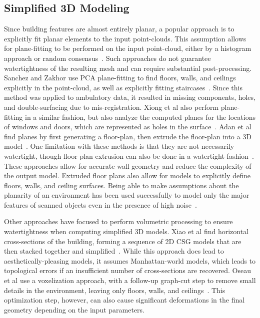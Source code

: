\documentclass[12pt,onecolumn,oneside]{book}
\begin{document}
\subsection{Simplified 3D Modeling}
\label{ssec:background_planefit}

Since building features are almost entirely planar, a popular approach is to explicitly fit planar elements to the input point-clouds.  This assumption allows for plane-fitting to be performed on the input point-cloud, either by a histogram approach or random consensus~\cite{HistWallRecon,BasicPlaneFit}.  Such approaches do not guarantee watertightness of the resulting mesh and can require substantial post-processing.  Sanchez and Zakhor use PCA plane-fitting to find floors, walls, and ceilings explicitly in the point-cloud, as well as explicitly fitting staircases~\cite{Victors}. Since this method was applied to ambulatory data, it resulted in missing components, holes, and double-surfacing due to mis-registration.  Xiong et al also perform plane-fitting in a similar fashion, but also analyze the computed planes for the locations of windows and doors, which are represented as holes in the surface~\cite{Xiong13}.  Adan et al find planes by first generating a floor-plan, then extrude the floor-plan into a 3D model~\cite{WallFinder}.  One limitation with these methods is that they are not necessarily watertight, though floor plan extrusion can also be done in a watertight fashion~\cite{Mura14,Turner14,Cabral14}.  These approaches allow for accurate wall geometry and reduce the complexity of the output model. Extruded floor plans also allow for models to explicitly define floors, walls, and ceiling surfaces.  Being able to make assumptions about the planarity of an environment has been used successfully to model only the major features of scanned objects even in the presence of high noise~\cite{Lafarge13}.

Other approaches have focused to perform volumetric processing to ensure watertightness when computing simplified 3D models.  Xiao et al find horizontal cross-sections of the building, forming a sequence of 2D CSG models that are then stacked together and simplified~\cite{Museums}.  While this approach does lead to aesthetically-pleasing models, it assumes Manhattan-world models, which leads to topological errors if an insufficient number of cross-sections are recovered.  Oseau et al use a voxelization approach, with a follow-up graph-cut step to remove small details in the environment, leaving only floors, walls, and ceilings~\cite{Oesau13}.  This optimization step, however, can also cause significant deformations in the final geometry depending on the input parameters. 
\end{document}
